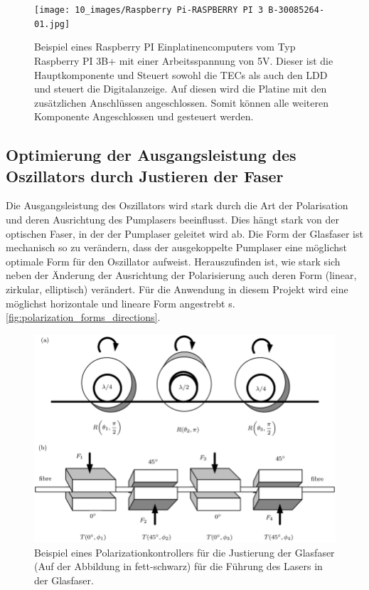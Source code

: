 \begin{figure}[H]
    \centering
    \texttt{[image: 10\_images/Raspberry Pi-RASPBERRY PI 3 B-30085264-01.jpg]}
    \caption{Beispiel eines Raspberry PI Einplatinencomputers vom Typ Raspberry PI 3B+ mit einer Arbeitsspannung von 5V. Dieser ist die Hauptkomponente und Steuert sowohl die TECs als auch den LDD und steuert die Digitalanzeige. Auf diesen wird die Platine mit den zusätzlichen Anschlüssen angeschlossen. Somit können alle weiteren Komponente Angeschlossen und gesteuert werden.}
    \label{fig:raspberry_pi}
\end{figure}

\subsection{Optimierung der Ausgangsleistung des Oszillators durch Justieren der Faser}
Die Ausgangsleistung des Oszillators wird stark durch die Art der Polarisation und deren Ausrichtung des Pumplasers beeinflusst. Dies hängt stark von der optischen Faser, in der der Pumplaser geleitet wird ab. Die Form der Glasfaser ist mechanisch so zu verändern, dass der ausgekoppelte Pumplaser eine möglichst optimale Form für den Oszillator aufweist. Herauszufinden ist, wie stark sich neben der Änderung der Ausrichtung der Polarisierung auch deren Form (linear, zirkular, elliptisch) verändert. Für die Anwendung in diesem Projekt wird eine möglichst horizontale und lineare Form angestrebt s. \ref{fig:polarization_forms_directions}.\\

\begin{figure}[H]
    \centering
    \includegraphics[scale=0.4, trim={15mm 125mm 0 0},clip]{98_images/laser_plarizationcontroller.png}
    \caption{Beispiel eines Polarizationkontrollers für die Justierung der Glasfaser (Auf der Abbildung in fett-schwarz) für die Führung des Lasers in der Glasfaser.}
    \label{fig:polarizationcontroller}
\end{figure}

